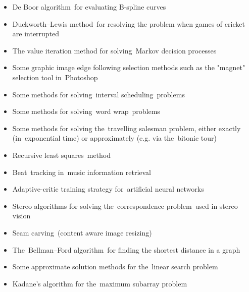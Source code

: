 \begin{itemize}
\item De Boor algorithm for evaluating B-spline curves
\item Duckworth–Lewis method for resolving the problem when games of cricket are interrupted
\item The value iteration method for solving Markov decision processes
\item Some graphic image edge following selection methods such as the "magnet" selection tool in Photoshop
\item Some methods for solving interval scheduling problems
\item Some methods for solving word wrap problems
\item Some methods for solving the travelling salesman problem, either exactly (in exponential time) or approximately (e.g. via the bitonic tour)
\item Recursive least squares method
\item Beat tracking in music information retrieval
\item Adaptive-critic training strategy for artificial neural networks
\item Stereo algorithms for solving the correspondence problem used in stereo vision
\item Seam carving (content aware image resizing)
\item The Bellman–Ford algorithm for finding the shortest distance in a graph
\item Some approximate solution methods for the linear search problem
\item Kadane's algorithm for the maximum subarray problem
\end{itemize}
